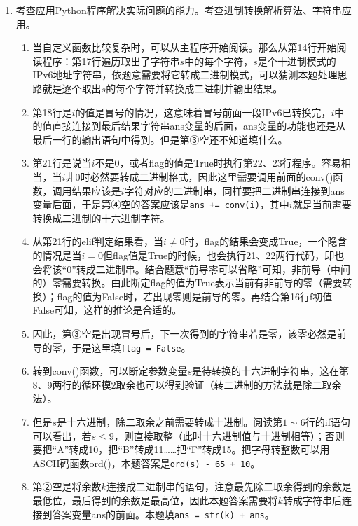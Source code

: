 \begin{enumerate}
\item 考查应用Python程序解决实际问题的能力。考查进制转换解析算法、字符串应用。
	\begin{enumerate}[label=$(\alph*)$]
\setcounter{qnumber}{1}
\begin{lstlisting}[numbers=left]
def conv(s):
    ans = ""
    if s > "9":
        `\clozeblank{2}`
    else:
        s = int(s)
    while s > 0:
        k = s % 2
        s //= 2
        `\clozeblank{2}`
    for i in range(4 - len(ans)):
        ans = "0" + ans
    return ans
s = "2A08:CCD6:0088:108A:0011:0002:202F:AA05"
ans = ""
flag = False
for i in s:
    if i == ":":
        `\clozeblank{2}`
        ans += i
    elif i != "0" or flag == True :
        `\clozeblank{2}`
        flag = True
print("原IPv6地址为:", s)
print("去前导零后:", ans)
\end{lstlisting}
	\item 当自定义函数比较复杂时，可以从主程序开始阅读。那么从第14行开始阅读程序：第17行遍历取出了字符串$s$中的每个字符，$s$是个十进制模式的IPv6地址字符串，依题意需要将它转成二进制模式，可以猜测本题处理思路就是逐个取出$s$的每个字符并转换成二进制并输出结果。
	\item 第18行是$i$的值是冒号的情况，这意味着冒号前面一段IPv6已转换完，$i$中的值直接连接到最后结果字符串ans变量的后面，ans变量的功能也还是从最后一行的输出语句中得到。但是第③空还不知道填什么。
	\item 第21行是说当$i$不是0，或者flag的值是True时执行第22、23行程序。容易相当，当$i$非0时必然要转成二进制格式，因此这里需要调用前面的conv()函数，调用结果应该是$i$字符对应的二进制串，同样要把二进制串连接到ans变量后面，于是第④空的答案应该是\lstinline|ans += conv(i)|，其中$i$就是当前需要转换成二进制的十六进制字符。
	\item 从第21行的elif判定结果看，当$i \neq 0$时，flag的结果会变成True，一个隐含的情况是当$i=0$但flag值是True的时候，也会执行21、22两行代码，即也会将该“0”转成二进制串。结合题意“前导零可以省略”可知，非前导（中间的）零需要转换。由此断定flag的值为True表示当前有非前导的零（需要转换）；flag的值为False时，若出现零则是前导的零。再结合第16行f初值False可知，这样的推论是合适的。
	\item 因此，第③空是出现冒号后，下一次得到的字符串若是零，该零必然是前导的零，于是这里填\lstinline|flag = False|。
	\item 转到conv()函数，可以断定参数变量$s$是待转换的十六进制字符串，这在第8、9两行的循环模2取余也可以得到验证（转二进制的方法就是除二取余法）。
	\item 但是$s$是十六进制，除二取余之前需要转成十进制。阅读第$1 \sim 6$行的if语句可以看出，若$s \le 9$，则直接取整（此时十六进制值与十进制相等）；否则要把“A”转成10，把“B”转成11……把“F”转成15。把字母转整数可以用ASCII码函数ord()，本题答案是\lstinline|ord(s) - 65 + 10|。
	\item 第②空是将余数$k$连接成二进制串的语句，注意最先除二取余得到的余数是最低位，最后得到的余数是最高位，因此本题答案需要将$k$转成字符串后连接到答案变量ans的前面。本题填\lstinline|ans = str(k) + ans|。	
	\end{enumerate}



\end{enumerate}
